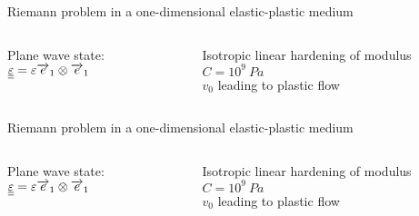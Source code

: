 \begin{frame}{Riemann problem in a one-dimensional elastic-plastic medium \cite{Thomas_EP}}
  \vskip 5pt
  \begin{columns}
    \begin{column}{0.49\textwidth}
      Plane wave state: ${\underline{\underline{\varepsilon}}}=\varepsilon {\overrightarrow{e}}_1 \otimes {\overrightarrow{e}}_1$ %
    \end{column}
    \begin{footnotesize}
      \begin{column}{0.49\textwidth}
        Isotropic linear hardening of modulus $C=10^9 \:Pa$ \\
        $v_0$ leading to plastic flow \\
      \end{column}
    \end{footnotesize}
  \end{columns}
  \centering
  
\end{frame}

\begin{frame}{Riemann problem in a one-dimensional elastic-plastic medium \cite{Thomas_EP}}
  \vskip 5pt
  \begin{columns}
    \begin{column}{0.49\textwidth}
      Plane wave state: ${\underline{\underline{\varepsilon}}}=\varepsilon {\overrightarrow{e}}_1 \otimes {\overrightarrow{e}}_1$ %
    \end{column}
    \begin{footnotesize}
      \begin{column}{0.49\textwidth}
        Isotropic linear hardening of modulus $C=10^9 \:Pa$ \\
        $v_0$ leading to plastic flow \\
      \end{column}
    \end{footnotesize}
  \end{columns}
    \centering
    
\end{frame}

%         

